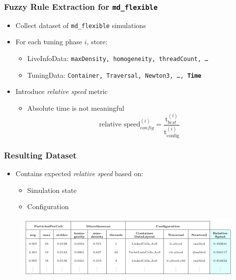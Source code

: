\documentclass[
	10pt,
	t		%
]{beamer}
\begin{document}
\begin{frame}
	\frametitle{Fuzzy Rule Extraction for \texttt{md\_flexible}}
	
	\begin{itemize}
		\item Collect dataset of \texttt{md\_flexible} simulations
		\item For each tuning phase $i$, store:
		      \begin{itemize}
			      \item LiveInfoData: {\footnotesize \texttt{maxDensity, homogeneity, threadCount, \dots} }
			      \item TuningData: {\footnotesize \texttt{Container, Traversal, Newton3, \dots, \textbf{Time}} }
		      \end{itemize}
		\item Introduce \textit{relative speed} metric
		      \begin{itemize}
			      \item Absolute time is not meaningful
			            \[ \text{relative speed}_{config}^{(i)} = \frac{\text{t}_{best}^{(i)}}{\text{t}_{\text{config}}^{(i)}} \]
		      \end{itemize}
	\end{itemize}
	
\end{frame}

\begin{frame}
	\frametitle{Resulting Dataset}
	
	\begin{itemize}
		\item Contains expected \textit{relative speed} based on:
		      \begin{itemize}
			      \item Simulation state
			      \item Configuration
		      \end{itemize}
	\end{itemize}
	
	\begin{figure}
		\centering
		\includegraphics[width=1\textwidth]{figures/relative-speed-table.png}
	\end{figure}
	
\end{frame}
\end{document}
